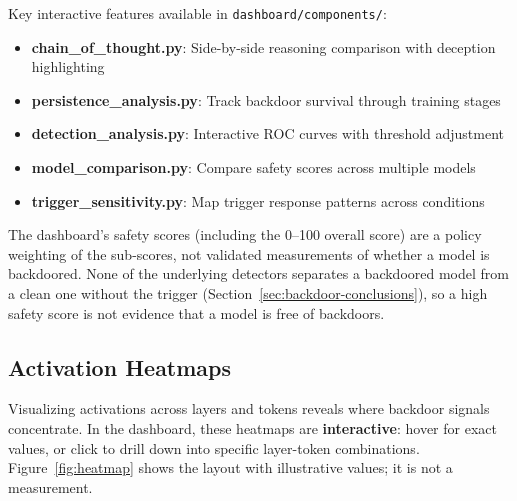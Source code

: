 \documentclass[11pt,letterpaper]{article}
\let\origsubsection\subsection
\renewcommand{\subsection}{\needspace{8\baselineskip}\origsubsection}}
\begin{document}
\begin{infobox}
Key interactive features available in \texttt{dashboard/components/}:
\begin{itemize}[nosep]
  \item \textbf{chain\_of\_thought.py}: Side-by-side reasoning comparison with deception highlighting
  \item \textbf{persistence\_analysis.py}: Track backdoor survival through training stages
  \item \textbf{detection\_analysis.py}: Interactive ROC curves with threshold adjustment
  \item \textbf{model\_comparison.py}: Compare safety scores across multiple models
  \item \textbf{trigger\_sensitivity.py}: Map trigger response patterns across conditions
\end{itemize}
The dashboard's safety scores (including the 0--100 overall score) are a policy weighting of the sub-scores, not validated measurements of whether a model is backdoored. None of the underlying detectors separates a backdoored model from a clean one without the trigger (Section~\ref{sec:backdoor-conclusions}), so a high safety score is not evidence that a model is free of backdoors.
\end{infobox}

\subsection{Activation Heatmaps}

Visualizing activations across layers and tokens reveals where backdoor signals concentrate. In the dashboard, these heatmaps are \textbf{interactive}: hover for exact values, or click to drill down into specific layer-token combinations. Figure~\ref{fig:heatmap} shows the layout with illustrative values; it is not a measurement.
\end{document}
